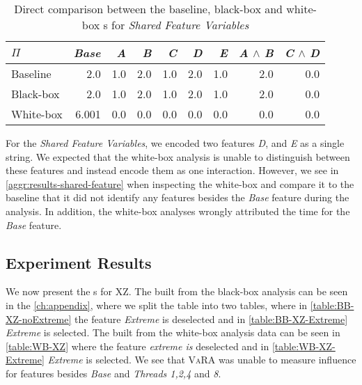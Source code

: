 \begin{table}[H]
    \centering
    \begin{tabular}{lrrrrrrrr}
    \toprule
    $\Pi$    & \emph{Base} & \emph{A} & \emph{B} & \emph{C} & \emph{D} & \emph{E}& \emph{A} $\land$ \emph{B} & \emph{C} $\land$ \emph{D}  \\ \midrule
    Baseline & 2.0    & 1.0 & 2.0 & 1.0 & 2.0 & 1.0 & 2.0           & 0.0           \\
    Black-box &  2.0    & 1.0 & 2.0 & 1.0 & 2.0 & 1.0 & 2.0           & 0.0           \\
    White-box  &  6.001 &  0.0 &  0.0 &  0.0 &  0.0 &  0.0 &     0.0 &     0.0\\\bottomrule
    \end{tabular}  
    \caption{Direct comparison between the baseline, black-box and white-box {\perfInfluenceModel}s for \emph{Shared Feature Variables}}
    \label{aggr:results-shared-feature}
\end{table}

For the \emph{Shared Feature Variables}, we encoded two features \emph{D}, and \emph{E} as a single string. 
We expected that the white-box analysis is unable to distinguish between these features and instead encode them as one interaction. 
However, we see in \autoref{aggr:results-shared-feature} when inspecting the white-box {\perfInfluenceModel}
and compare it to the baseline that it did not identify any features besides the \emph{Base} feature during the analysis. 
In addition, the white-box analyses {\perfInfluenceModel} wrongly attributed the time for the \emph{Base} feature.

\subsection{Experiment Results}

We now present the {\perfInfluenceModel}s for \textsc{XZ}. The {\perfInfluenceModel} built from the black-box analysis can be seen
in the \autoref{ch:appendix}, where we split the table into two tables, where in \autoref{table:BB-XZ-noExtreme} the feature \emph{Extreme} is 
deselected and in \autoref{table:BB-XZ-Extreme} \emph{Extreme} is selected. The {\perfInfluenceModel} built from the white-box analysis data
can be seen in \autoref{table:WB-XZ} where the feature \emph{extreme is} deselected and in \autoref{table:WB-XZ-Extreme} \emph{Extreme} is selected.
We see that \textsc{VaRA} was unable to measure influence for features besides \emph{Base} and \emph{Threads 1,2,4} and \emph{8}.

